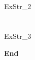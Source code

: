 \documentclass[a4paper, leqno, 12pt]{article} %
\newenvironment{top_enumerate}{
\begin{enumerate}
  \setlength{\itemsep}{2em}
  \setlength{\topsep}{-0pt}
  \setlength{\partopsep}{-0pt}
}{\end{enumerate}}
\begin{document}
\bigskip
\section*{}

\begin{top_enumerate}

ExStr_2

\end{top_enumerate}

\bigskip
\section*{}

\begin{top_enumerate}

ExStr_3

\end{top_enumerate}

\rfoot{}                %
\begin{flushright}      %
\textbf{End}
\end{flushright}
\end{document}
